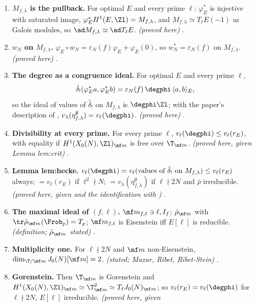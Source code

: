 \begin{enumerate}[label=\textbf{\thechapter.\arabic*}]
.
\item \textbf{$M_{f,\lambda}$ is the pullback.} For optimal $E$ and every prime $\ell$: $\varphi_E^*$ is injective with saturated image, $\varphi_E^*H^1(E,\Zl)=M_{f,\lambda}$, and $M_{f,\lambda}\simeq T_\ell E(-1)$ as Galois modules, so
$\ad M_{f,\lambda}\simeq\ad T_\ell E$. \emph{(proved here)} .
\item \textbf{$w_N$ on $M_{f,\lambda}$.} $\varphi_E\circ w_N=\varepsilon_N(f)\varphi_E+\varphi_E(0)$, so $w_N^*=\varepsilon_N(f)$ on $M_{f,\lambda}$. \emph{(proved here)} .
\item \textbf{The degree as a congruence ideal.} For optimal $E$ and every prime $\ell$,
\[
\hat\delta_!(\varphi_E^*a,\varphi_E^*b)=\varepsilon_N(f)\,\degphi\,\langle a,b\rangle_E,
\]
so the ideal of values of $\hat\delta_!$ on $M_{f,\lambda}$ is $\degphi\Zl$; with the paper's description of \cite{DFG04}, $v_\lambda(\eta^\emptyset_{f,\lambda})=v_\ell(\degphi)$. \emph{(proved here)} .
\item \textbf{Divisibility at every prime.} For every prime $\ell$, $v_\ell(\degphi)\le v_\ell(r_E)$, with equality if $H^1(X_0(N),\Zl)_{\mf m}$ is free over $\T_{\mf m}$. \emph{(proved here, given Lemma lem:crit)}
.
\item \textbf{Lemma lem:hecke.} $v_\ell(\degphi)=v_\ell(\text{values of }\hat\delta_!\text{ on }M_{f,\lambda})\le v_\ell(r_E)$ always; $=v_\ell(r_E)$ if $\ell^2\nmid N$; $=v_\lambda(\eta^\emptyset_{f,\lambda})$ if $\ell\nmid2N$ and $\bar\rho$
irreducible. \emph{(proved here, given  and the identification with \cite{DFG04})} .
\item \textbf{The maximal ideal of $(f,\ell)$.} $\mf m_{f,\ell}\ni\ell,I_f$; $\bar\rho_{\mf m}$ with $\tr\bar\rho_{\mf m}(\Frob_p)=T_p$; $\mf m_{f,\ell}$ is Eisenstein iff $E[\ell]$ is reducible. \emph{(definition; $\bar\rho_{\mf m}$ stated)}
.
\item \textbf{Multiplicity one.} For $\ell\nmid2N$ and $\mf m$ non-Eisenstein, $\dim_{\T/\mf m}J_0(N)[\mf m]=2$. \emph{(stated; Mazur, Ribet, Ribet-Stein)} .
\item \textbf{Gorenstein.} Then $\T_{\mf m}$ is Gorenstein and $H^1(X_0(N),\Zl)_{\mf m}\simeq\T_{\mf m}^2\simeq T_\ell J_0(N)_{\mf m}$; so $v_\ell(r_E)=v_\ell(\degphi)$ for $\ell\nmid2N$, $E[\ell]$ irreducible. \emph{(proved here, given
}
\end{enumerate}
